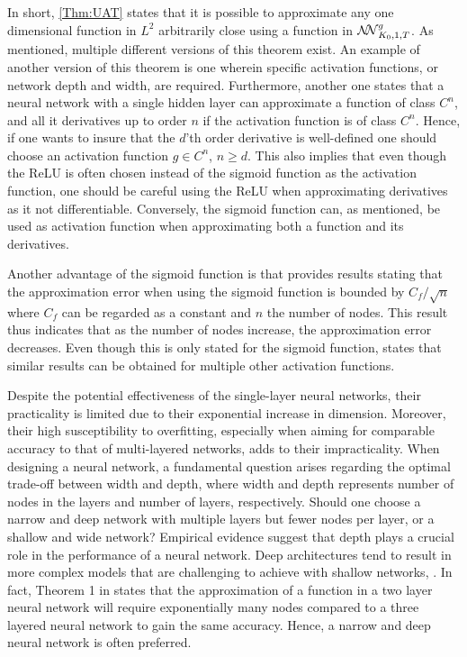 In short, \autoref{Thm:UAT} states that it is possible to approximate any one dimensional function in $L^2$ arbitrarily close using a function in $\mathcal{N\mkern-5mu N}^g_{K_0, 1, T}$. As mentioned, multiple different versions of this theorem exist. An example of another version of this theorem is one wherein specific activation functions, or network depth and width, are required. Furthermore, another one states that a neural network with a single hidden layer can approximate a function of class $C^n$, and all it derivatives up to order $n$ if the activation function is of class $C^n$. Hence, if one wants to insure that the $d$'th order derivative is well-defined one should choose an activation function $g \in C^n$, $n \geq d$. This also implies that even though the ReLU is often chosen instead of the sigmoid function as the activation function, one should be careful using the ReLU when approximating derivatives as it not differentiable. Conversely, the sigmoid function can, as mentioned, be used as activation function when approximating both a function and its derivatives.

Another advantage of the sigmoid function is that \citep{Barron} provides results stating that the approximation error when using the sigmoid function is bounded by $C_f/\sqrt{n}$ where $C_f$ can be regarded as a constant and $n$ the number of nodes. This result thus indicates that as the number of nodes increase, the approximation error decreases. Even though this is only stated for the sigmoid function, \citep[s. 117]{Barron} states that similar results can be obtained for multiple other activation functions.

Despite the potential effectiveness of the single-layer neural networks, their practicality is limited due to their exponential increase in dimension. Moreover, their high susceptibility to overfitting, especially when aiming for comparable accuracy to that of multi-layered networks, adds to their impracticality. When designing a neural network, a fundamental question arises regarding the optimal trade-off between width and depth, where width and depth represents number of nodes in the layers and number of layers, respectively. Should one choose a narrow and deep network with multiple layers but fewer nodes per layer, or a shallow and wide network? Empirical evidence suggest that depth plays a crucial role in the performance of a neural network. Deep architectures tend to result in more complex models that are challenging to achieve with shallow networks, \citep{REOS}. In fact, Theorem 1 in \citep{REOS} states that the approximation of a function in a two layer neural network will require exponentially many nodes compared to a three layered neural network to gain the same accuracy. Hence, a narrow and deep neural network is often preferred.